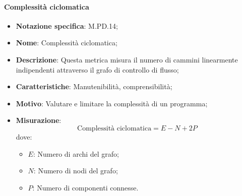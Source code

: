 \paragraph*{Complessità ciclomatica}
\begin{itemize}
    \item \textbf{Notazione specifica}: M.PD.14;
    \item \textbf{Nome}: Complessità ciclomatica;
    \item \textbf{Descrizione}: Questa metrica misura il numero di cammini linearmente indipendenti attraverso il grafo di controllo di flusso;
    \item \textbf{Caratteristiche}: Manutenibilità, comprensibilità;
    \item \textbf{Motivo}: Valutare e limitare la complessità di un programma;
    \item \textbf{Misurazione}: 
    \[
    \text{Complessità ciclomatica} = \textit{E} - \textit{N} + \textit{2P}
    \]
    dove:
    \begin{itemize}
        \item $E$: Numero di archi del grafo;
        \item $N$: Numero di nodi del grafo;
        \item $P$: Numero di componenti connesse.
    \end{itemize}
\end{itemize}
